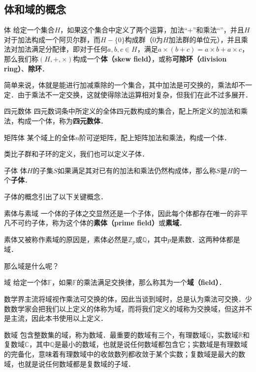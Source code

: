 

\subsection{体和域的概念}

\begin{definition}{体}
给定一个集合$H$，如果这个集合中定义了两个运算，加法“+”和乘法“\times”，并且$H$对于加法构成一个阿贝尔群，而$H-\{0\}$构成群（$0$为$H$加法群的单位元），并且乘法对加法满足分配律，即对于任何$a, b, c\in H$，满足$a\times(b+c)=a\times b+a\times c$，那么我们称$(H, +, \times)$构成一个\textbf{体（skew field）}，或称\textbf{可除环（division ring）}、\textbf{除环}．
\end{definition}

简单来说，体就是能进行加减乘除的一个集合，其中加法是可交换的，乘法却不一定．由于乘法不一定交换，这就使得除法运算相对复杂，但我们在此不过多展开．

\begin{example}{四元数体}
四元数词条中所定义的全体四元数构成的集合，配上所定义的加法和乘法，构成一个体，称为\textbf{四元数体}．
\end{example}

\begin{example}{矩阵体}
某个域上的全体$n$阶可逆矩阵，配上矩阵加法和乘法，构成一个体．
\end{example}

类比子群和子环的定义，我们也可以定义子体．

\begin{definition}{子体}
体$H$的子集$S$如果满足其对已有的加法和乘法仍然构成体，那么称$S$是$H$的一个\textbf{子体}．
\end{definition}
子体的概念引出了以下关键概念．
\begin{definition}{素体与素域}
一个体的子体之交显然还是一个子体，因此每个体都存在唯一的非平凡不可约子体，称为这个体的\textbf{素体（prime field）}或\textbf{素域}．
\end{definition}

素体又被称作素域的原因是，素体必然是$\mathbb{Z}_p$或$\mathbb{Q}$，其中$p$是素数．这两种体都是域．

那么域是什么呢？

\begin{definition}{域}
给定一个体$\mathbb{F}$，如果$\mathbb{F}$的乘法满足交换律，那么称其为一个\textbf{域（field）}．
\end{definition}

数学界主流将域视作乘法可交换的体，因此当谈到域时，总是认为乘法可交换．少数数学家会把我们以上定义的体称为域，而将我们定义的域称为交换域，但这并不是主流，因此本书使用以上定义．

\begin{example}{数域}
包含整数集的域，称为数域．最重要的数域有三个，有理数域$\mathbb{Q}$，实数域$\mathbb{R}$和复数域$\mathbb{C}$，其中$\mathbb{Q}$是最小的数域，也就是说任何数域都包含它；实数域是有理数域的完备化，意味着有理数域中的收敛数列都收敛于某个实数；复数域是最大的数域，也就是说任何数域都是复数域的子域．
\end{example}
